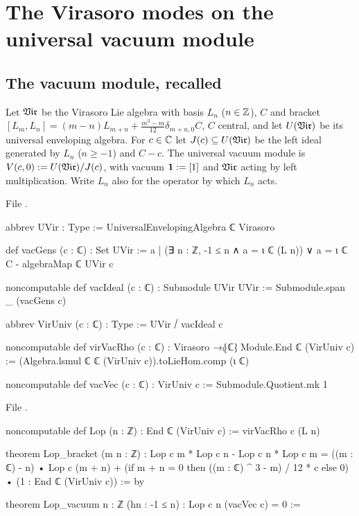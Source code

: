 \section{The Virasoro modes on the universal vacuum module}\label{l06:sec:modes}

\subsection{The vacuum module, recalled}

\begin{definition}\label{l06:def:Vc}
Let $\mathfrak{Vir}$ be the Virasoro Lie algebra with basis $L_n$ ($n\in{\mathbb{Z}}$), $C$ and bracket
$[L_m,L_n] = (m-n)L_{m+n}+\frac{m^3-m}{12}\delta_{m+n,0}C$, $C$ central, and let $U(\mathfrak{Vir})$ be its universal
enveloping algebra. For $c\in{\mathbb{C}}$ let $J(c)\subseteq U(\mathfrak{Vir})$ be the left ideal generated by $L_n$
($n\ge-1$) and $C-c$. The universal vacuum module is $V(c,0) := U(\mathfrak{Vir})/J(c)$, with vacuum
$\mathbf{1} := [1]$ and $\mathfrak{Vir}$ acting by left multiplication. Write $L_n$ also for the operator by
which $L_n$ acts.
\end{definition}

File .
\begin{leancode}
abbrev UVir : Type := UniversalEnvelopingAlgebra ℂ Virasoro

def vacGens (c : ℂ) : Set UVir :=
  {a | (∃ n : ℤ, -1 ≤ n ∧ a = ι ℂ (L n)) ∨ a = ι ℂ C - algebraMap ℂ UVir c}

noncomputable def vacIdeal (c : ℂ) : Submodule UVir UVir :=
  Submodule.span _ (vacGens c)

abbrev VirUniv (c : ℂ) : Type := UVir ⧸ vacIdeal c

noncomputable def virVacRho (c : ℂ) : Virasoro →ₗ⁅ℂ⁆ Module.End ℂ (VirUniv c) :=
  (Algebra.lsmul ℂ ℂ (VirUniv c)).toLieHom.comp (ι ℂ)

noncomputable def vacVec (c : ℂ) : VirUniv c := Submodule.Quotient.mk 1
\end{leancode}
File .
\begin{leancode}
noncomputable def Lop (n : ℤ) : End ℂ (VirUniv c) := virVacRho c (L n)

theorem Lop_bracket (m n : ℤ) :
    Lop c m * Lop c n - Lop c n * Lop c m
      = ((m : ℂ) - n) • Lop c (m + n)
        + (if m + n = 0 then ((m : ℂ) ^ 3 - m) / 12 * c else 0) • (1 : End ℂ (VirUniv c)) := by

theorem Lop_vacuum {n : ℤ} (hn : -1 ≤ n) : Lop c n (vacVec c) = 0 :=
\end{leancode}

